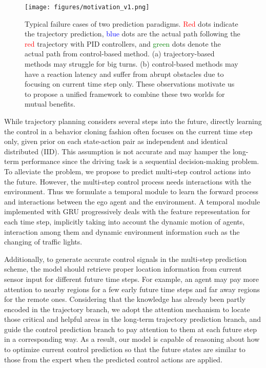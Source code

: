 \documentclass{article}
\begin{document}
\begin{figure}[t!]
      \centering
      \texttt{[image: figures/motivation\_v1.png]}
\caption{Typical failure cases of two prediction paradigms. \textcolor{red}{Red} dots indicate the trajectory prediction, \textcolor{blue}{blue} dots are the actual path following the \textcolor{red}{red} trajectory with PID controllers, and \textcolor{green}{green} dots denote the actual path from control-based method. (a)  trajectory-based methods may struggle for big turns. (b) control-based methods may have a reaction latency and suffer from abrupt obstacles due to focusing on current time step only. 
These observations motivate us to propose a unified framework to combine these two worlds for mutual benefits.
}
\label{fig:motivation}
  \end{figure}



While trajectory planning considers several steps into the future, directly learning the control in a behavior cloning fashion \citep{pomerleau1988alvinn, muller2005e2eavoidance, codevilla2018cil, codevilla2019cilrs, chen2020lbc} often focuses on the current time step only, given prior on each state-action pair as independent and identical distributed (IID).
This assumption is not accurate and may hamper the long-term performance since the driving task is a sequential decision-making problem. To alleviate the problem, we propose  to predict multi-step control actions into the future.
However, the multi-step control process needs interactions with the environment. Thus we formulate a temporal module to learn the forward process and interactions between the ego agent and the environment.
A temporal module implemented with GRU \citep{GRU} progressively deals with the feature representation for each time step,  implicitly taking into account the dynamic motion of agents, interaction among them and dynamic environment information such as the changing of traffic lights.


Additionally, to generate accurate control signals in the multi-step prediction scheme, the model should retrieve proper location information from current sensor input for different future time steps. For example, an agent may pay more attention to nearby regions for a few early future time steps and far away regions for the remote ones. Considering that the knowledge has already been partly encoded in the trajectory branch, we adopt the attention mechanism to locate those critical and helpful areas in the long-term trajectory prediction branch, and guide the control prediction branch to pay attention to them at each future step in a corresponding way.
As a result, our model is capable of reasoning about how to optimize current control prediction so that the future states are similar to those from the expert when the predicted control actions are applied.
\end{document}
